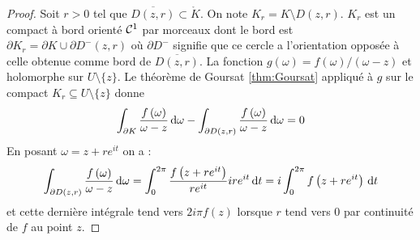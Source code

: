 \documentclass{cours}
\begin{document}
\begin{proof}
    Soit $r > 0$ tel que $\overline{D\left(z, r\right)} \subset \mathring{K}$. On note $K_{r} = K \setminus D\left(z, r\right)$. $K_{r}$ est un compact à bord orienté $\mathcal{C}^{1}$ par morceaux dont le bord est $\partial K_{r} = \partial K \cup \partial D^{-}\left(z, r\right)$ où $\partial D^{-}$ signifie que ce cercle a l'orientation opposée à celle obtenue comme bord de $\overline{D\left(z,r\right)}$. La fonction $g\left(\omega\right) = f\left(\omega\right)/\left(\omega - z\right)$ et holomorphe sur $U \setminus \{z\}$. Le théorème de Goursat \ref{thm:Goursat} appliqué à $g$ sur le compact $K_{r} \subseteq U \setminus \{z\}$ donne 
    \begin{equation*}
        \int_{\partial K}\frac{f\left(\omega\right)}{\omega - z}{\rm \, d} \omega - \int_{\partial D\left(z, r\right)} \frac{f\left(\omega\right)}{\omega - z}{\rm \, d} \omega = 0
    \end{equation*}
    En posant $\omega = z + re^{it}$ on a : 
    \begin{equation*}
        \int_{\partial D\left(z, r\right)}\frac{f\left(\omega\right)}{\omega - z}{\rm \, d} \omega = \int_{0}^{2\pi}\frac{f\left(z + re^{it}\right)}{re^{it}}ire^{it}{\rm \, d} t = i \int_{0}^{2\pi}f\left(z + re^{it}\right) {\rm \, d} t
    \end{equation*}
    et cette dernière intégrale tend vers $2i\pi f\left(z\right)$ lorsque $r$ tend vers $0$ par continuité de $f$ au point $z$. 
\end{proof}
\end{document}
